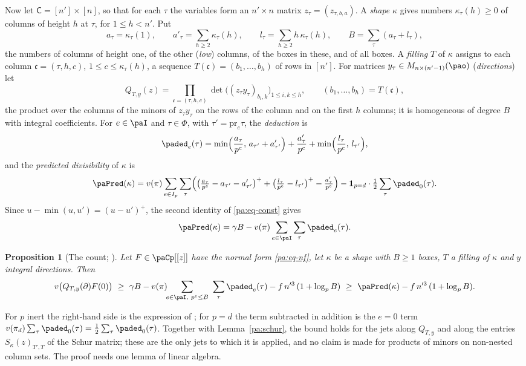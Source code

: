 \documentclass[10pt]{amsart}
\newtheorem{proposition}[theorem]{Proposition}
\theoremstyle{definition}
\theoremstyle{remark}
\providecommand{\auPl}{\Phi}
\begin{document}
Now let $\mathsf C=[n']\times[n]$, so that for each $\tau$ the variables form an $n'\times n$
matrix $z_\tau=(z_{\tau,b,a})$. A \emph{shape} $\kappa$ gives numbers $\kappa_\tau(h)\ge0$ of
columns of height $h$ at $\tau$, for $1\le h<n'$. Put
\[
a_\tau=\kappa_\tau(1),\qquad a'_\tau=\sum_{h\ge2}\kappa_\tau(h),\qquad
l_\tau=\sum_{h\ge2}h\,\kappa_\tau(h),\qquad B=\sum_\tau(a_\tau+l_\tau),
\]
the numbers of columns of height one, of the other (\emph{low}) columns, of the boxes in these, and
of all boxes. A \emph{filling} $T$ of $\kappa$ assigns to each column $\mathfrak c=(\tau,h,c)$,
$1\le c\le\kappa_\tau(h)$, a sequence $T(\mathfrak c)=(b_1,\dots,b_h)$ of rows in $[n']$. For
matrices $y_\tau\in M_{n\times(n'-1)}(\pao)$ (\emph{directions}) let
\[
Q_{T,y}(z)=\prod_{\mathfrak c=(\tau,h,c)}\det\bigl((z_\tau y_\tau)_{b_i,k}\bigr)_{1\le i,k\le h},
\qquad(b_1,\dots,b_h)=T(\mathfrak c),
\]
the product over the columns of the minors of $z_\tau y_\tau$ on the rows of the column and on the
first $h$ columns; it is homogeneous of degree $B$ with integral coefficients. For $e\in\paI$ and
$\tau\in\auPl$, with $\tau'=\mathrm{pr}_e\tau$, the \emph{deduction} is
\[
\paded_e(\tau)=\min\Bigl(\frac{a_\tau}{p^e},\,a_{\tau'}+a'_{\tau'}\Bigr)+\frac{a'_\tau}{p^e}
+\min\Bigl(\frac{l_\tau}{p^e},\,l_{\tau'}\Bigr),
\]
and the \emph{predicted divisibility} of $\kappa$ is
\[
\paPred(\kappa)=v(\pi)\sum_{e\in I_p}\sum_{\tau}\Bigl(\bigl(\tfrac{a_\tau}{p^e}-a_{\tau'}-
a'_{\tau'}\bigr)^+ +\bigl(\tfrac{l_\tau}{p^e}-l_{\tau'}\bigr)^+-\tfrac{a'_\tau}{p^e}\Bigr)
-\mathbf 1_{p=d}\cdot\tfrac12\sum_\tau\paded_0(\tau).
\]
Since $u-\min(u,u')=(u-u')^+$, the second identity of \eqref{pa:eq-const} gives
\begin{equation}\label{pa:eq-pred}
\paPred(\kappa)=\gamma B-v(\pi)\sum_{e\in\paI}\sum_\tau\paded_e(\tau).
\end{equation}

\begin{proposition}[The count; {\cite[Proposition~14.10]{P46}}]\label{pa:count}
Let $F\in\paCp[[z]]$ have the normal form \eqref{pa:eq-nf}, let $\kappa$ be a shape with $B\ge1$
boxes, $T$ a filling of $\kappa$ and $y$ integral directions. Then
\[
v\bigl(Q_{T,y}(\partial)F(0)\bigr)\ \ge\ \gamma B-v(\pi)\!\!\sum_{e\in\paI,\ p^e\le B}\ \sum_\tau
\paded_e(\tau)-f\,n'^3\,(1+\log_pB)\ \ge\ \paPred(\kappa)-f\,n'^3\,(1+\log_pB).
\]
\end{proposition}

For $p$ inert the right-hand side is the expression of {\cite[Proposition~14.10]{P46}}; for $p=d$ the
term subtracted in addition is the $e=0$ term $v(\pi_d)\sum_\tau\paded_0(\tau)=\tfrac12\sum_\tau\paded_0(\tau)$. Together with
Lemma~\ref{pa:schur}, the bound holds for the jets along $Q_{T,y}$ and along the entries
$S_\kappa(z)_{T',T}$ of the Schur matrix; these are the only jets to which it is applied, and no
claim is made for products of minors on non-nested column sets. The proof needs one lemma of
linear algebra.
\end{document}
